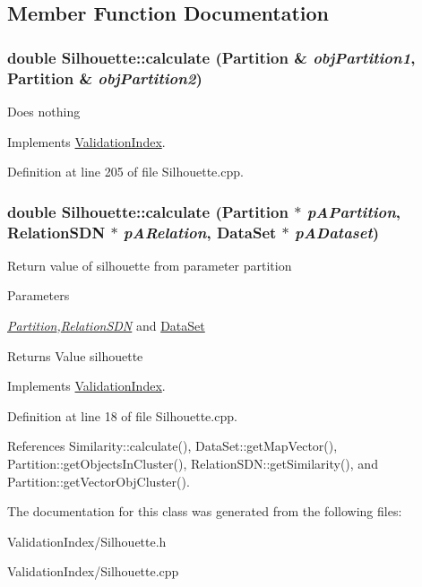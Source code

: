 \subsection{Member Function Documentation}
\hypertarget{classSilhouette_aaf47b647b2409999209c58316ab8e980}{
\subsubsection[{calculate}]{\setlength{\rightskip}{0pt plus 5cm}double Silhouette::calculate ({\bf Partition} \& {\em objPartition1}, \/  {\bf Partition} \& {\em objPartition2})}}
\label{classSilhouette_aaf47b647b2409999209c58316ab8e980}
Does nothing 

Implements \hyperlink{classValidationIndex_a8b688d8d53fbdacec393730fe2bab614}{ValidationIndex}.

Definition at line 205 of file Silhouette.cpp.\hypertarget{classSilhouette_af8817c1accb7b60814cfff988c9ccc05}{
\subsubsection[{calculate}]{\setlength{\rightskip}{0pt plus 5cm}double Silhouette::calculate ({\bf Partition} $\ast$ {\em pAPartition}, \/  {\bf RelationSDN} $\ast$ {\em pARelation}, \/  {\bf DataSet} $\ast$ {\em pADataset})}}
\label{classSilhouette_af8817c1accb7b60814cfff988c9ccc05}
Return value of silhouette from parameter partition 
\begin{DoxyParams}{Parameters}
\item[{\em \hyperlink{classPartition}{Partition},\hyperlink{classRelationSDN}{RelationSDN}}]and \hyperlink{classDataSet}{DataSet} \end{DoxyParams}
\begin{DoxyReturn}{Returns}
Value silhouette 
\end{DoxyReturn}


Implements \hyperlink{classValidationIndex_a26fe1244f3313bd7f557149f6846fe01}{ValidationIndex}.

Definition at line 18 of file Silhouette.cpp.

References Similarity::calculate(), DataSet::getMapVector(), Partition::getObjectsInCluster(), RelationSDN::getSimilarity(), and Partition::getVectorObjCluster().

The documentation for this class was generated from the following files:\begin{DoxyCompactItemize}
\item 
ValidationIndex/Silhouette.h\item 
ValidationIndex/Silhouette.cpp\end{DoxyCompactItemize}
